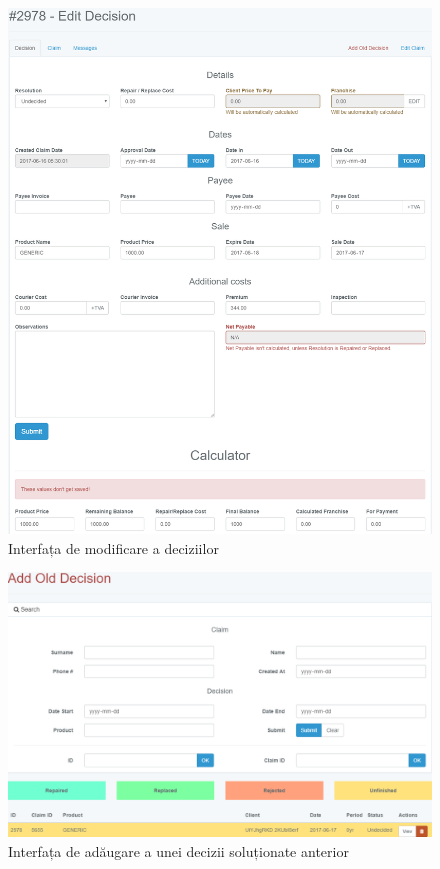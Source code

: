 			\begin{figure}
				\includegraphics[width=\linewidth]{../imagini/decisions_edit.png}
				\caption{Interfața de modificare a deciziilor}
				\label{fig:decisions_edit}
			\end{figure}


		\begin{figure}
			\includegraphics[width=\linewidth]{../imagini/decisions_add_old.png}
			\caption{Interfața de adăugare a unei decizii soluționate anterior}
			\label{fig:decisions_add_old}
		\end{figure}

